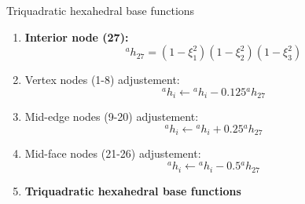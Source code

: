 \documentclass[aspectratio=169]{beamer}
\begin{document}
\begin{frame}{Triquadratic hexahedral base functions}
    \begin{enumerate}

        \item[7.] {\color{LimeGreen}\textbf{Interior node (27):}}
              \vspace{-.2cm}
              \[
                  {}^ah_{27}=(1-\xi_1^2)(1-\xi_2^2)(1-\xi_3^2)
              \]
        \item[8.] Vertex nodes (1-8) adjustement:
              \vspace{-.2cm}
              \[
                  {}^ah_i \leftarrow{}^ah_i - 0.125 {}^ah_{27}
              \]
              \vspace{-.7cm}
        \item[9.] Mid-edge nodes (9-20) adjustement:
              \vspace{-.2cm}
              \[
                  {}^ah_i \leftarrow{}^ah_i + 0.25{}^ah_{27}
              \]
              \vspace{-.7cm}
        \item[10.] Mid-face nodes (21-26) adjustement:
              \vspace{-.2cm}
              \[
                  {}^ah_i \leftarrow{}^ah_i - 0.5{}^ah_{27}
              \]
        \item[$\rightarrow$] \textbf{Triquadratic hexahedral base functions}
    \end{enumerate}
\end{frame}
\end{document}

